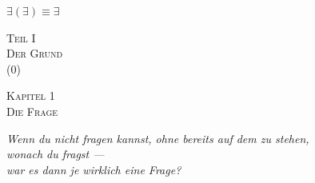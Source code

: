 \documentclass[10pt, openany, oneside]{book}
\renewcommand{\normalsize}{\fontsize{10}{13}\selectfont}
\renewcommand{\large}{\fontsize{11.5}{14}\selectfont}
\renewcommand{\LARGE}{\fontsize{15}{18}\selectfont}
\renewcommand{\huge}{\fontsize{17}{21}\selectfont}
\begin{document}
\begin{center}
    $\exists(\exists) \equiv \exists$
\end{center}


%
%
%
%

%
%

\newpage
\thispagestyle{empty}
\vspace*{\fill}
\begin{center}
    {\LARGE\scshape Teil I}\\[1em]
    {\large\scshape Der Grund}\\[0.5em]
    {\normalsize (0)}
\end{center}
\vspace*{\fill}
\newpage


\newpage

\begin{center}
    {\huge\scshape Kapitel 1}\\[0.3em]
    {\large\scshape Die Frage}
\end{center}

\vspace{1.5em}

\begin{center}
    \itshape
    Wenn du nicht fragen kannst, ohne bereits auf dem zu stehen,\\
    wonach du fragst ---\\
    war es dann je wirklich eine Frage?
\end{center}

\vspace{2em}

\end{document}
